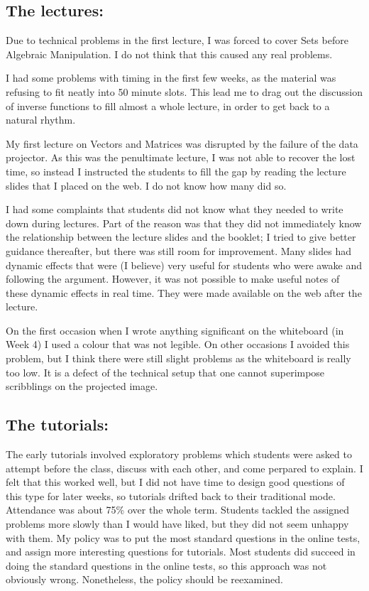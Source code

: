 \documentclass{amsart}
\begin{document}
\subsection*{The lectures:}

Due to technical problems in the first lecture, I was forced to cover
Sets before Algebraic Manipulation.  I do not think that this caused
any real problems.

I had some problems with timing in the first few weeks, as the
material was refusing to fit neatly into 50 minute slots.  This lead
me to drag out the discussion of inverse functions to fill almost a
whole lecture, in order to get back to a natural rhythm.

My first lecture on Vectors and Matrices was disrupted by the failure
of the data projector.  As this was the penultimate lecture, I was not
able to recover the lost time, so instead I instructed the students to
fill the gap by reading the lecture slides that I placed on the web.
I do not know how many did so.

I had some complaints that students did not know what they needed to
write down during lectures.  Part of the reason was that they did not
immediately know the relationship between the lecture slides and the
booklet; I tried to give better guidance thereafter, but there was
still room for improvement.  Many slides had dynamic effects that were
(I believe) very useful for students who were awake and following the
argument.  However, it was not possible to make useful notes of these
dynamic effects in real time.  They were made available on the web
after the lecture.

On the first occasion when I wrote anything significant on the
whiteboard (in Week 4) I used a colour that was not legible.  On other
occasions I avoided this problem, but I think there were still slight
problems as the whiteboard is really too low.  It is a defect of the
technical setup that one cannot superimpose scribblings on the
projected image.

\subsection*{The tutorials:}

The early tutorials involved exploratory problems which students were
asked to attempt before the class, discuss with each other, and come
perpared to explain.  I felt that this worked well, but I did not have
time to design good questions of this type for later weeks, so
tutorials drifted back to their traditional mode.  Attendance was
about 75\% 
over the whole term.  Students tackled the assigned problems more
slowly than I would have liked, but they did not seem unhappy with
them.  My policy was to put the most standard questions in the online
tests, and assign more interesting questions for tutorials.  Most
students did succeed in doing the standard questions in the online
tests, so this approach was not obviously wrong.  Nonetheless, the
policy should be reexamined.
\end{document}
